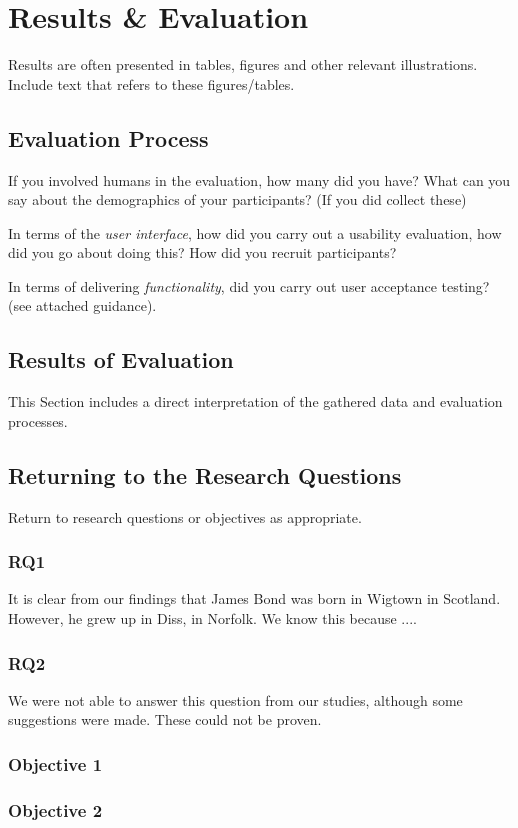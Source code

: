 \section{Results \& Evaluation}\label{results}

Results are often presented in tables, figures and other relevant illustrations. Include text that refers to these figures/tables. 

\subsection{Evaluation Process}
 If you  involved humans in the evaluation, how many did you have? What can you say about the demographics of your participants? (If you did collect these)

In terms of the \emph{user interface}, how did you carry out a usability evaluation, how did you go about doing this? How did you recruit participants?

In terms of delivering \emph{functionality}, did you carry out user acceptance testing? (see attached guidance).  


\subsection{Results of Evaluation}
This Section includes a direct interpretation of the gathered data and evaluation processes. 

\subsection{Returning to the Research Questions}
Return to research questions or objectives as appropriate. 

\subsubsection{RQ1}
It is clear from our findings that James Bond was born in Wigtown in Scotland. However, he grew up in Diss, in Norfolk. 
We know this because ....


\subsubsection{RQ2}
We were not able to answer this question from our studies, although some suggestions were made. These could not be proven. 

\subsubsection{Objective 1}


\subsubsection{Objective 2}